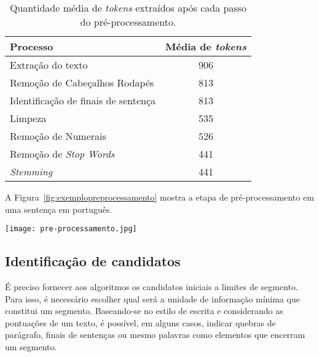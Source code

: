 \begin{table}[!h]
	\centering

	\begin{tabular}{|l|c|}
	
		\hline
		\textbf{Processo}      &  \textbf{Média de \textit{tokens}}\\		

		\hline

		Extração do texto                    & 906 \\ \hline
		Remoção de Cabeçalhos Rodapés        & 813 \\ \hline
		Identificação de finais de sentença  & 813 \\ \hline
		Limpeza                              & 535 \\ \hline
		Remoção de Numerais                  & 526 \\ \hline
		Remoção de \textit{Stop Words}       & 441 \\ \hline
		\textit{Stemming}                    & 441 \\ \hline
		
		
	\end{tabular}
	
	\caption{Quantidade média de \textit{tokens} extraídos após cada passo do pré-processamento.}
	\label{tab:preprocessamento}
\end{table}


A Figura~\ref{fig:exemplopreprocessamento} mostra a etapa de pré-processamento em uma sentença em português.
	


  \begin{figure*}
	\centering
	\texttt{[image: pre-processamento.jpg]}
	\caption{Exemplo de pré-processamento.}
	\label{fig:exemplopreprocessamento}
  \end{figure*}






\subsection{Identificação de candidatos}
	\label{subsec:indentificacaosentencas}
	
	
	
	É preciso fornecer aos algoritmos os candidatos iniciais a limites de segmento. Para isso, é necessário escolher qual será a unidade de informação mínima que constitui um segmento. Baseando-se no estilo de escrita e considerando as pontuações de um texto, é possível, em alguns casos, indicar quebras de parágrafo, finais de sentenças ou mesmo palavras como elementos que encerram um segmento. 

